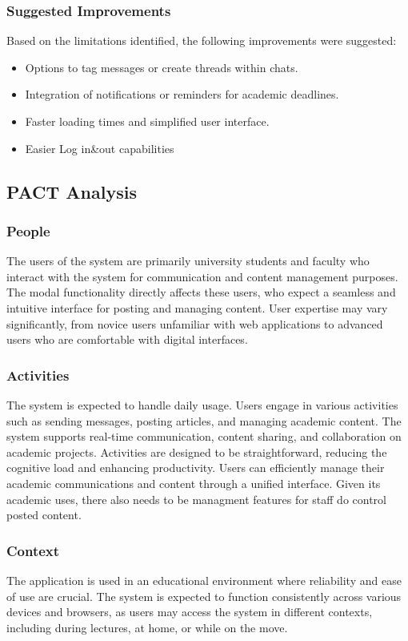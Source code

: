 \documentclass[12pt,a4paper]{article}
\begin{document}
\subsubsection*{Suggested Improvements}
Based on the limitations identified, the following improvements were suggested:
\begin{itemize}
    \item Options to tag messages or create threads within chats.
    \item Integration of notifications or reminders for academic deadlines.
    \item Faster loading times and simplified user interface.
    \item Easier Log in\&out capabilities
\end{itemize}

\subsection*{PACT Analysis}

\subsubsection*{People}
The users of the system are primarily university students and faculty who interact with the system for communication and content management purposes. The modal functionality directly affects these users, who expect a seamless and intuitive interface for posting and managing content. User expertise may vary significantly, from novice users unfamiliar with web applications to advanced users who are comfortable with digital interfaces.

\subsubsection*{Activities}
 The system is expected to handle daily usage. Users engage in various activities such as sending messages, posting articles, and managing academic content. The system supports real-time communication, content sharing, and collaboration on academic projects. Activities are designed to be straightforward, reducing the cognitive load and enhancing productivity. Users can efficiently manage their academic communications and content through a unified interface. Given its academic uses, there also needs to be managment features for staff do control posted content. 

\subsubsection*{Context}
The application is used in an educational environment where reliability and ease of use are crucial. The system is expected to function consistently across various devices and browsers, as users may access the system in different contexts, including during lectures, at home, or while on the move.
\end{document}
